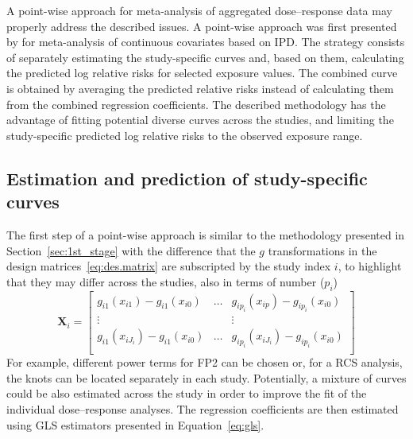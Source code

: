 \documentclass[11pt,a4paper,twoside,openany]{book}\usepackage{knitr}
\begin{document}
{{A point-wise approach for meta-analysis of aggregated dose--response data may properly address the described issues.
A point-wise approach was first presented by \cite{sauerbrei2011new} for meta-analysis of continuous covariates based on IPD. The strategy consists of separately estimating the study-specific curves and, based on them, calculating the predicted log relative risks for selected exposure values. The combined curve is obtained by averaging the predicted relative risks instead of calculating them from the combined regression coefficients. The described methodology has the advantage of fitting potential diverse curves across the studies, and limiting the study-specific predicted log relative risks to the observed exposure range.   

\subsection{Estimation and prediction of study-specific curves}

The first step of a point-wise approach is similar to the methodology presented in Section~\ref{sec:1st_stage} with the difference that the $g$ transformations in the design matrices~\ref{eq:des.matrix} are subscripted by the study index $i$, to highlight that they may differ across the studies, also in terms of number ($p_i$) 
\begin{equation}
 \mathbf{X}_i=\left[
\begin{array}{ccc}
g_{i1}(x_{i1}) - g_{i1}(x_{i0}) & \hdots & g_{ip_i}(x_{ip}) - g_{ip_i}(x_{i0}) \\
\vdots &  & \vdots \\
g_{i1}(x_{iJ_i}) -  g_{i1}(x_{i0}) & \hdots & g_{ip_i}(x_{iJ_i}) -  g_{ip_i}(x_{i0}) \\
\end{array}
\right] 
\label{eq:des.matrix_pwa}
\end{equation}
\noindent For example, different power terms for FP2 can be chosen or, for a RCS analysis, the knots can be located separately in each study. Potentially, a mixture of curves could be also estimated across the study in order to improve the fit of the individual dose--response analyses. The regression coefficients are then estimated using GLS estimators presented in Equation~\ref{eq:gls}.

}}
\end{document}
